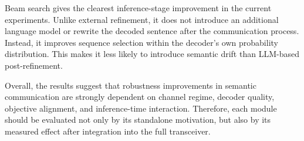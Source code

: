 Beam search gives the clearest inference-stage improvement in the current experiments. Unlike external refinement, it does not introduce an additional language model or rewrite the decoded sentence after the communication process. Instead, it improves sequence selection within the decoder’s own probability distribution. This makes it less likely to introduce semantic drift than LLM-based post-refinement.

Overall, the results suggest that robustness improvements in semantic communication are strongly dependent on channel regime, decoder quality, objective alignment, and inference-time interaction. Therefore, each module should be evaluated not only by its standalone motivation, but also by its measured effect after integration into the full transceiver.
